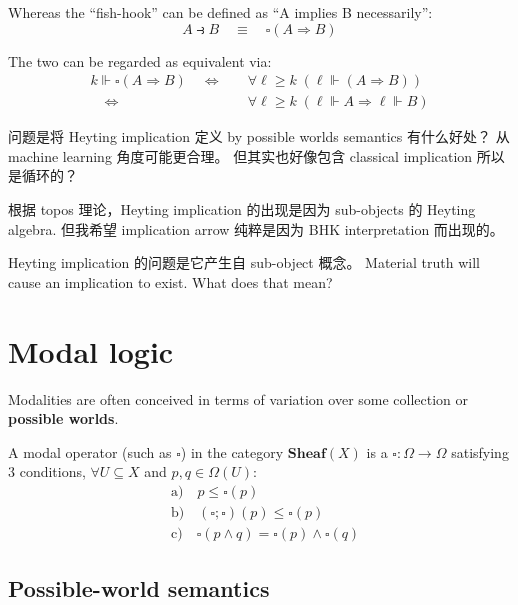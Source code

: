 Whereas the ``fish-hook''  can be defined as ``A implies B necessarily'':
\begin{equation}
A \strictif B \quad \equiv \quad \square (A \Rightarrow B) 
\end{equation}

The two can be regarded as equivalent via:
\begin{equation}
\begin{aligned}
k \Vdash \square (A \Rightarrow B) \quad \Leftrightarrow \quad & \forall \ell \ge k \; (\ell \Vdash (A \Rightarrow B)) \\
\quad \Leftrightarrow \quad & \forall \ell \ge k \; (\ell \Vdash A \Rightarrow \ell \Vdash B)
\end{aligned}
\end{equation}

问题是将 Heyting implication 定义 by possible worlds semantics 有什么好处？  从 machine learning 角度可能更合理。  但其实也好像包含 classical implication 所以是循环的？  

根据 topos 理论，Heyting implication 的出现是因为 sub-objects 的 Heyting algebra.  但我希望 implication arrow 纯粹是因为 BHK interpretation 而出现的。 

Heyting implication 的问题是它产生自 sub-object 概念。 Material truth will cause an implication to exist.  What does that mean?  

\section{Modal logic}

Modalities are often conceived in terms of variation over some collection or \textbf{possible worlds}.

A modal operator (such as $\square$) in the category $\mathbf{Sheaf}(X)$ is a  $\square: \Omega \rightarrow \Omega$ satisfying 3 conditions, $\forall U \subseteq X$ and $p, q \in \Omega(U)$:
\begin{equation}
\begin{aligned}
& \mbox{a)} \quad p \le \square (p) \\
& \mbox{b)} \quad (\square ; \square) (p) \le \square (p) \\
& \mbox{c)} \quad \square (p \wedge q) = \square (p) \wedge \square (q)
\end{aligned}
\end{equation}

\subsection{Possible-world semantics}

